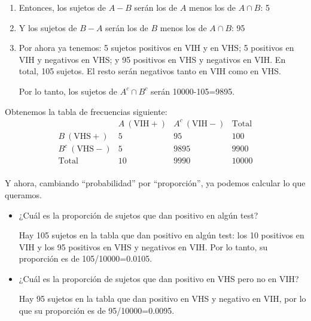 \documentclass[
  spanish,
  letterpaper,
  DIV=11,
  numbers=noendperiod]{scrreprt}
\begin{document}
\begin{tcolorbox}
\begin{enumerate}
  En resumen: \[
  \begin{array}{r|c|c|c}
  & A\ (\text{VIH}+) & A^c \ (\text{VIH}-)  & \text{Total} \\ \hline
  B\ (\text{VHS}+) &  5  &     &   100 \\ \hline
  B^c\ (\text{VHS}-) &     &      &   9900 \\ \hline 
  \text{Total} & 10& 9990 & 10000  \\ 
  \end{array}
  \]
\item
  Entonces, los sujetos de \(A-B\) serán los de \(A\) menos los de
  \(A\cap B\): 5
\item
  Y los sujetos de \(B-A\) serán los de \(B\) menos los de \(A\cap B\):
  95
\item
  Por ahora ya tenemos: 5 sujetos positivos en VIH y en VHS; 5 positivos
  en VIH y negativos en VHS; y 95 positivos en VHS y negativos en VIH.
  En total, 105 sujetos. El resto serán negativos tanto en VIH como en
  VHS.

  Por lo tanto, los sujetos de \(A^c\cap B^c\) serán 10000-105=9895.
\end{enumerate}

Obtenemos la tabla de frecuencias siguiente: \[
\begin{array}{r|c|c|c}
& A\ (\text{VIH}+) & A^c \ (\text{VIH}-)  & \text{Total} \\ \hline
B\ (\text{VHS}+) &  5  &  95  &   100 \\ \hline
B^c\ (\text{VHS}-) &  5  &   9895  &   9900 \\ \hline 
\text{Total} & 10& 9990 & 10000  \\ 
\end{array}
\]

Y ahora, cambiando ``probabilidad'' por ``proporción'', ya podemos
calcular lo que queramos.

\begin{itemize}
\item
  ¿Cuál es la proporción de sujetos que dan positivo en algún test?

  Hay 105 sujetos en la tabla que dan positivo en algún test: los 10
  positivos en VIH y los 95 positivos en VHS y negativos en VIH. Por lo
  tanto, su proporción es de 105/10000=0.0105.
\item
  ¿Cuál es la proporción de sujetos que dan positivo en VHS pero no en
  VIH?

  Hay 95 sujetos en la tabla que dan positivo en VHS y negativo en VIH,
  por lo que su proporción es de 95/10000=0.0095.
\end{itemize}


\end{tcolorbox}
\end{document}
